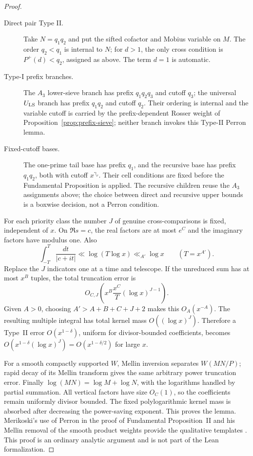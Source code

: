 \documentclass[10pt,reqno]{amsart}
\newcommand{\1}{\mathbf{1}}
\theoremstyle{plain}
\theoremstyle{remark}
\begin{document}
\begin{proof}
\begin{description}
\item[Direct pair Type II.]
Take \(N=q_1q_2\) and put the sifted cofactor and Mobius variable on \(M\).
The order \(q_2<q_1\) is internal to \(N\); for \(d>1\), the only cross
condition is \(P^+(d)<q_2\), assigned as above.  The term \(d=1\) is automatic.

\item[Type-I prefix branches.]
The \(A_3\) lower-sieve branch has prefix \(q_1q_2q_3\) and cutoff \(q_3\);
the universal \(U_{\rm LS}\) branch has prefix \(q_1q_2\) and cutoff \(q_2\).
Their ordering is internal and the variable cutoff is carried by the
prefix-dependent Rosser weight of Proposition~\ref{prop:prefix-sieve};
neither branch invokes this Type-II Perron lemma.

\item[Fixed-cutoff bases.]
The one-prime tail base has prefix \(q_1\), and the recursive base has
prefix \(q_1q_2\), both with cutoff \(x^{\gamma_\nu}\).
Their cell conditions are fixed before the Fundamental Proposition is
applied.  The recursive children reuse the \(A_3\) assignments above; the
choice between direct and recursive upper bounds is a boxwise decision, not
a Perron condition.
\end{description}

For each priority class the number $J$ of genuine cross-comparisons is fixed,
independent of $x$.  On $\Re s=c$, the real factors are at most $e^C$ and
the imaginary factors have modulus one.  Also
\[
 \int_{-T}^{T}\frac{dt}{|c+it|}
 \ll\log(T\log x)\ll_{A'}\log x
 \qquad(T=x^{A'}).
\]
Replace the $J$ indicators one at a time and telescope.  If the unreduced
sum has at most $x^B$ tuples, the total truncation error is
\[
 O_{C,J}\!\left(
 x^B\frac{x^C}{T}(\log x)^{J-1}\right).
\]
Given $A>0$, choosing $A'>A+B+C+J+2$ makes this
$O_A(x^{-A})$.  The resulting multiple integral has total kernel mass
$O((\log x)^J)$.  Therefore a Type~II error $O(x^{1-\delta})$, uniform for
divisor-bounded coefficients, becomes
$O(x^{1-\delta}(\log x)^J)=O(x^{1-\delta/2})$ for large $x$.

For a smooth compactly supported $W$, Mellin inversion separates
$W(MN/P)$; rapid decay of its Mellin transform gives the same arbitrary
power truncation error.  Finally
$\log(MN)=\log M+\log N$, with the logarithms handled by partial
summation.  All vertical factors have size $O_C(1)$, so the coefficients
remain uniformly divisor bounded.  The fixed polylogarithmic kernel mass
is absorbed after decreasing the power-saving exponent.  This proves the
lemma.  Merikoski's use of Perron in the proof of Fundamental Proposition~II
and his Mellin removal of the smooth product weights provide the qualitative
templates \cite[Sections 2.3 and 3.4]{Merikoski2020}.  This proof is an
ordinary analytic argument and is not part of the Lean formalization.
\end{proof}
\end{document}
